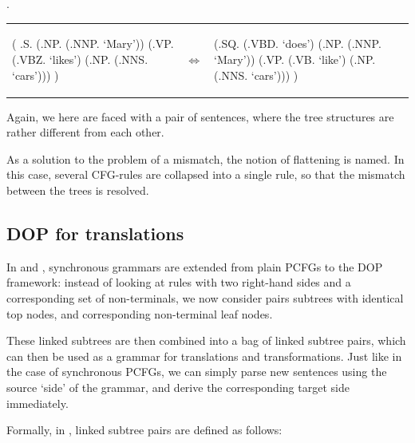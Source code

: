 \documentclass[a4paper]{article}
\theoremstyle{definition}
\begin{document}
\ex. \label{marylike}

\begin{tabular}{lll}
\begin{parsetree}
( .S.
    (.NP. (.NNP. `Mary'))
    (.VP. (.VBZ. `likes')
      (.NP. (.NNS. `cars')))
)
\end{parsetree}
& $\iff$ &
\begin{parsetree}
  (.SQ. (.VBD. `does')
    (.NP. (.NNP. `Mary'))
    (.VP. (.VB. `like')
      (.NP. (.NNS. `cars')))
    )
\end{parsetree}
\end{tabular}
\vspace{1em}

Again, we here are faced with a pair of sentences, where the tree structures
are rather different from each other.

As a solution to the problem of a mismatch, the notion of flattening is named.
In this case, several CFG-rules are collapsed into a single rule, so that the
mismatch between the trees is resolved.

\subsection{DOP for translations}

In \cite{Po} and \cite{Po2}, synchronous grammars are extended from plain
PCFGs to the DOP framework: instead of looking at rules with two right-hand
sides and a corresponding set of non-terminals, we now consider pairs
subtrees with identical top nodes, and corresponding non-terminal leaf nodes.

These linked subtrees are then combined into a bag of linked subtree pairs,
which can then be used as a grammar for translations and transformations. Just
like in the case of synchronous PCFGs, we can simply parse new sentences using
the source `side' of the grammar, and derive the corresponding target side
immediately.

Formally, in \cite{Po}, linked subtree pairs are defined as follows:
\end{document}
